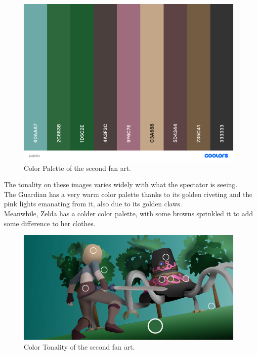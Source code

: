 \documentclass{cup-pan}
\begin{document}
            \begin{figure}[H]
                \includegraphics[width=\textwidth]{Imagenes/Fanart2/Analysis/palette.png}
                \caption{Color Palette of the second fan art.}
            \end{figure}

            The tonality on these images varies widely with what the spectator is seeing. \\
            The Guardian has a very warm color palette thanks to its golden riveting and the pink lights emanating from it, also due to its golden claws. \\
            Meanwhile, Zelda has a colder color palette, with some browns sprinkled it to add some difference to her clothes. \\
            \begin{figure}[H]
                \includegraphics[width=\textwidth]{Imagenes/Fanart2/Analysis/tonalidad.png}
                \caption{Color Tonality of the second fan art.}
            \end{figure}
\end{document}

